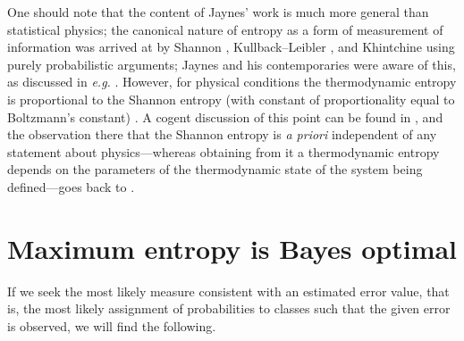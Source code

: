 \documentclass[11pt]{amsart}
\numberwithin{equation}{section}
\theoremstyle{remark}
\theoremstyle{remark}
\begin{document}
One should note that the content of Jaynes' work is much more general than statistical physics; the canonical nature of entropy as a form of measurement of information was arrived at by Shannon \cite{shannon}, Kullback--Leibler \cite{kullback1951information}, and Khintchine \cite{aleksandr1957mathematical} using purely probabilistic arguments; Jaynes and his contemporaries were aware of this, as discussed in {\it e.g.} \cite{jaynes1980minimum, williams1980bayesian, skyrms1987updating, jaynes1988relation, csiszar1991least, jaynes2003probability}. However, for physical conditions the thermodynamic entropy is proportional to the Shannon entropy (with constant of proportionality equal to Boltzmann's constant) \cite{jizba2020shannon}. A cogent discussion of this point can be found in \cite{presse}, and the observation there that the Shannon entropy is {\it a priori} independent of any statement about physics---whereas obtaining from it a thermodynamic entropy depends on the parameters of the thermodynamic state of the system being defined---goes back to \cite{jaynes1965gibbs}.

\section{Maximum entropy is Bayes optimal}

If we seek the most likely measure consistent with an estimated error value, that is, the most likely assignment of probabilities to classes such that the given error is observed, we will find the following.
\end{document}
